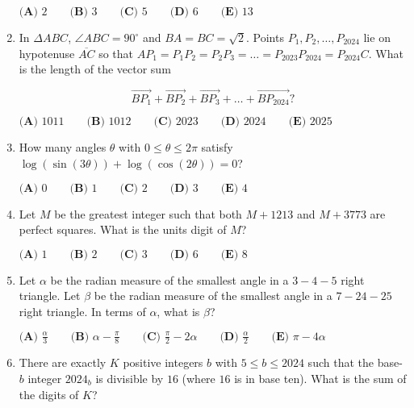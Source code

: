 \documentclass{article}
\begin{document}
\begin{enumerate}[label=\arabic*., itemsep=0.5em]
\(\textbf{(A) } 2 \qquad \textbf{(B) } 3 \qquad \textbf{(C) } 5 \qquad \textbf{(D) } 6 \qquad \textbf{(E) } 13\)\par \vspace{0.5em}\item In \(\Delta ABC\), \(\angle ABC = 90^\circ\) and \(BA = BC = \sqrt{2}\). Points \(P_1, P_2, \dots, P_{2024}\) lie on hypotenuse \(\overline{AC}\) so that \(AP_1= P_1P_2 = P_2P_3 = \dots = P_{2023}P_{2024} = P_{2024}C\). What is the length of the vector sum

\begin{equation*}
\overrightarrow{BP_1} + \overrightarrow{BP_2} + \overrightarrow{BP_3} + \dots + \overrightarrow{BP_{2024}}?
\end{equation*}

\(
\textbf{(A) }1011 \qquad
\textbf{(B) }1012 \qquad
\textbf{(C) }2023 \qquad
\textbf{(D) }2024 \qquad
\textbf{(E) }2025 \qquad
\)\par \vspace{0.5em}\item How many angles \(\theta\) with \(0\le\theta\le2\pi\) satisfy \(\log(\sin(3\theta))+\log(\cos(2\theta))=0\)?  

\( \textbf{(A) }0 \qquad \textbf{(B) }1 \qquad \textbf{(C) }2 \qquad \textbf{(D) }3 \qquad \textbf{(E) }4 \qquad \)\par \vspace{0.5em}\item Let \(M\) be the greatest integer such that both \(M + 1213\) and \(M + 3773\) are perfect squares. What is the units digit of \(M\)?

\(
\textbf{(A) }1 \qquad
\textbf{(B) }2 \qquad
\textbf{(C) }3 \qquad
\textbf{(D) }6 \qquad
\textbf{(E) }8 \qquad
\)\par \vspace{0.5em}\item Let \(\alpha\) be the radian measure of the smallest angle in a \(3{-}4{-}5\) right triangle. Let \(\beta\) be the radian measure of the smallest angle in a \(7{-}24{-}25\) right triangle. In terms of \(\alpha\), what is \(\beta\)?

\(
\textbf{(A) }\frac{\alpha}{3}\qquad
\textbf{(B) }\alpha - \frac{\pi}{8}\qquad
\textbf{(C) }\frac{\pi}{2} - 2\alpha \qquad
\textbf{(D) }\frac{\alpha}{2}\qquad
\textbf{(E) }\pi - 4\alpha\qquad
\)\par \vspace{0.5em}\item There are exactly \(K\) positive integers \(b\) with \(5 \leq b \leq 2024\) such that the base-\(b\) integer \(2024_b\) is divisible by \(16\) (where \(16\) is in base ten). What is the sum of the digits of \(K\)?


\end{enumerate}
\end{document}
